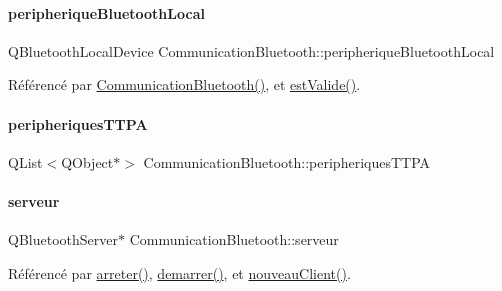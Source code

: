 \paragraph{\texorpdfstring{peripherique\+Bluetooth\+Local}{peripheriqueBluetoothLocal}}
{\footnotesize\ttfamily Q\+Bluetooth\+Local\+Device Communication\+Bluetooth\+::peripherique\+Bluetooth\+Local\hspace{0.3cm}{\ttfamily [private]}}



Référencé par \hyperlink{class_communication_bluetooth_ae1c3be7b0a32ee1142d958bad3d7c571}{Communication\+Bluetooth()}, et \hyperlink{class_communication_bluetooth_a69f544bb71f5287689ee051511811669}{est\+Valide()}.

\mbox{\label{class_communication_bluetooth_ad3032be59818aac8923565f0db6bf7c3}} 
\paragraph{\texorpdfstring{peripheriques\+T\+T\+PA}{peripheriquesTTPA}}
{\footnotesize\ttfamily Q\+List$<$Q\+Object$\ast$$>$ Communication\+Bluetooth\+::peripheriques\+T\+T\+PA\hspace{0.3cm}{\ttfamily [private]}}

\mbox{\label{class_communication_bluetooth_ace7c3b582db4257a20eb873ebfdf368a}} 
\paragraph{\texorpdfstring{serveur}{serveur}}
{\footnotesize\ttfamily Q\+Bluetooth\+Server$\ast$ Communication\+Bluetooth\+::serveur\hspace{0.3cm}{\ttfamily [private]}}



Référencé par \hyperlink{class_communication_bluetooth_ac87aa0a33a650b981786979468d34324}{arreter()}, \hyperlink{class_communication_bluetooth_a056f2cb0ff59757e027a430e356e22bc}{demarrer()}, et \hyperlink{class_communication_bluetooth_ab88c9bb8a1bd2c68e3d14fc3615be888}{nouveau\+Client()}.

